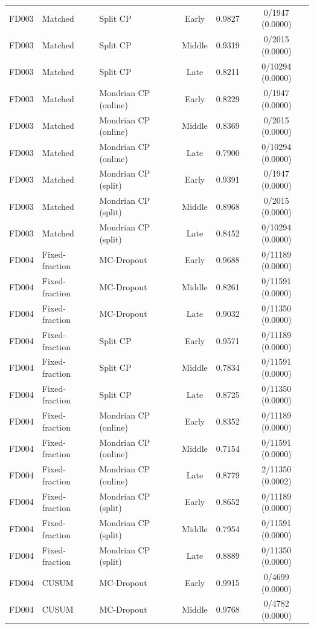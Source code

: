 \begin{table}[t]
\begin{tabular}{lllccc}
FD003 & Matched & Split CP & Early & 0.9827 & 0/1947 (0.0000) \\
FD003 & Matched & Split CP & Middle & 0.9319 & 0/2015 (0.0000) \\
FD003 & Matched & Split CP & Late & 0.8211 & 0/10294 (0.0000) \\
FD003 & Matched & Mondrian CP (online) & Early & 0.8229 & 0/1947 (0.0000) \\
FD003 & Matched & Mondrian CP (online) & Middle & 0.8369 & 0/2015 (0.0000) \\
FD003 & Matched & Mondrian CP (online) & Late & 0.7900 & 0/10294 (0.0000) \\
FD003 & Matched & Mondrian CP (split) & Early & 0.9391 & 0/1947 (0.0000) \\
FD003 & Matched & Mondrian CP (split) & Middle & 0.8968 & 0/2015 (0.0000) \\
FD003 & Matched & Mondrian CP (split) & Late & 0.8452 & 0/10294 (0.0000) \\
FD004 & Fixed-fraction & MC-Dropout & Early & 0.9688 & 0/11189 (0.0000) \\
FD004 & Fixed-fraction & MC-Dropout & Middle & 0.8261 & 0/11591 (0.0000) \\
FD004 & Fixed-fraction & MC-Dropout & Late & 0.9032 & 0/11350 (0.0000) \\
FD004 & Fixed-fraction & Split CP & Early & 0.9571 & 0/11189 (0.0000) \\
FD004 & Fixed-fraction & Split CP & Middle & 0.7834 & 0/11591 (0.0000) \\
FD004 & Fixed-fraction & Split CP & Late & 0.8725 & 0/11350 (0.0000) \\
FD004 & Fixed-fraction & Mondrian CP (online) & Early & 0.8352 & 0/11189 (0.0000) \\
FD004 & Fixed-fraction & Mondrian CP (online) & Middle & 0.7154 & 0/11591 (0.0000) \\
FD004 & Fixed-fraction & Mondrian CP (online) & Late & 0.8779 & 2/11350 (0.0002) \\
FD004 & Fixed-fraction & Mondrian CP (split) & Early & 0.8652 & 0/11189 (0.0000) \\
FD004 & Fixed-fraction & Mondrian CP (split) & Middle & 0.7954 & 0/11591 (0.0000) \\
FD004 & Fixed-fraction & Mondrian CP (split) & Late & 0.8889 & 0/11350 (0.0000) \\
FD004 & CUSUM & MC-Dropout & Early & 0.9915 & 0/4699 (0.0000) \\
FD004 & CUSUM & MC-Dropout & Middle & 0.9768 & 0/4782 (0.0000) \\

\end{tabular}
\end{table}
